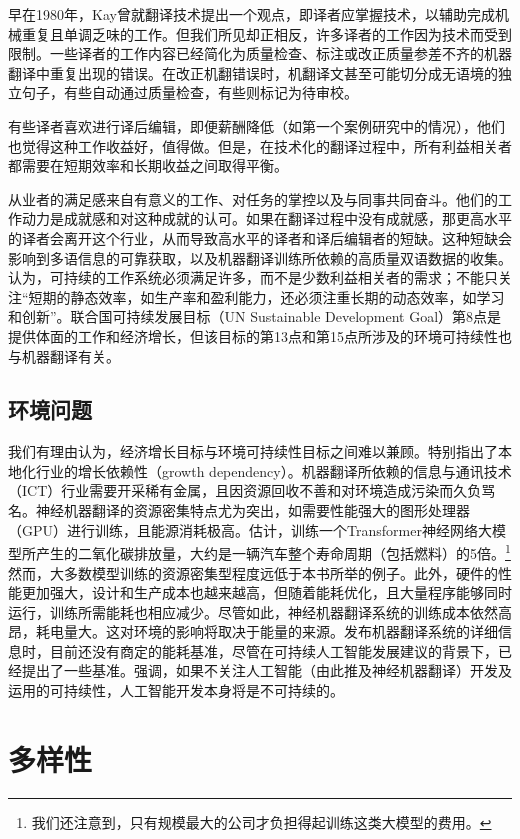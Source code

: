 \documentclass[output=paper]{langscibook}
\begin{document}
早在1980年，Kay曾就翻译技术提出一个观点，即译者应掌握技术，以辅助完成机械重复且单调乏味的工作\citep{Kay1980}。但我们所见却正相反，许多译者的工作因为技术而受到限制。一些译者的工作内容已经简化为质量检查、标注或改正质量参差不齐的机器翻译中重复出现的错误。在改正机翻错误时，机翻译文甚至可能切分成无语境的独立句子，有些自动通过质量检查，有些则标记为待审校。

有些译者喜欢进行译后编辑，即便薪酬降低（如第一个案例研究中的情况），他们也觉得这种工作收益好，值得做。但是，在技术化的翻译过程中，所有利益相关者都需要在短期效率和长期收益之间取得平衡。

从业者的满足感来自有意义的工作、对任务的掌控以及与同事共同奋斗。他们的工作动力是成就感和对这种成就的认可。如果在翻译过程中没有成就感，那更高水平的译者会离开这个行业，从而导致高水平的译者和译后编辑者的短缺。这种短缺会影响到多语信息的可靠获取，以及机器翻译训练所依赖的高质量双语数据的收集。\citet[4]{DochertyShari2008}认为，可持续的工作系统必须满足许多，而不是少数利益相关者的需求；不能只关注“短期的静态效率，如生产率和盈利能力，还必须注重长期的动态效率，如学习和创新”。联合国可持续发展目标（UN Sustainable Development Goal）第8点是提供体面的工作和经济增长，但该目标的第13点和第15点所涉及的环境可持续性也与机器翻译有关。


\subsection{环境问题}
我们有理由认为，经济增长目标与环境可持续性目标之间难以兼顾。\citet{Cronin2017}特别指出了本地化行业的增长依赖性（growth dependency）。机器翻译所依赖的信息与通讯技术（ICT）行业需要开采稀有金属，且因资源回收不善和对环境造成污染而久负骂名。神经机器翻译的资源密集特点尤为突出，如需要性能强大的图形处理器（GPU）进行训练，且能源消耗极高。\citet{StrubellMcCallum2019}估计，训练一个Transformer神经网络大模型所产生的二氧化碳排放量，大约是一辆汽车整个寿命周期（包括燃料）的5倍。\footnote{我们还注意到，只有规模最大的公司才负担得起训练这类大模型的费用。} 然而，大多数模型训练的资源密集型程度远低于本书所举的例子。此外，硬件的性能更加强大，设计和生产成本也越来越高，但随着能耗优化，且大量程序能够同时运行，训练所需能耗也相应减少。尽管如此，神经机器翻译系统的训练成本依然高昂，耗电量大。这对环境的影响将取决于能量的来源。发布机器翻译系统的详细信息时，目前还没有商定的能耗基准，尽管在可持续人工智能发展建议的背景下，已经提出了一些基准。\citet{VanWynsberghe2021}强调，如果不关注人工智能（由此推及神经机器翻译）开发及运用的可持续性，人工智能开发本身将是不可持续的。

\section{多样性}\label{sec:moorkens:5}\largerpage[2]
\end{document}
